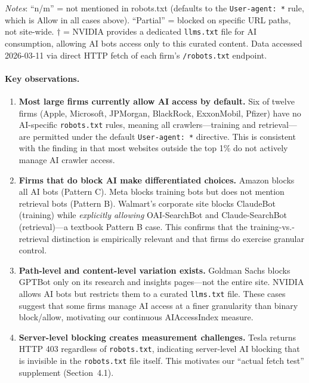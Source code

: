 \documentclass[12pt,a4paper]{article}
\begin{document}
\begin{table}[htbp]
\begin{tabularx}{\textwidth}{p{2.2cm}p{1.4cm}p{1.4cm}p{1.4cm}p{1.4cm}X}
\bottomrule
\end{tabularx}
\begin{tablenotes}
\small
\item \textit{Notes}: ``n/m'' = not mentioned in robots.txt (defaults to the \texttt{User-agent: *} rule, which is Allow in all cases above). ``Partial'' = blocked on specific URL paths, not site-wide. $\dagger$ = NVIDIA provides a dedicated \texttt{llms.txt} file for AI consumption, allowing AI bots access only to this curated content. Data accessed 2026-03-11 via direct HTTP fetch of each firm's \texttt{/robots.txt} endpoint.
\end{tablenotes}
\end{table}

\paragraph{Key observations.}
\begin{enumerate}
    \item \textbf{Most large firms currently allow AI access by default.} Six of twelve firms (Apple, Microsoft, JPMorgan, BlackRock, ExxonMobil, Pfizer) have no AI-specific \texttt{robots.txt} rules, meaning all crawlers---training and retrieval---are permitted under the default \texttt{User-agent: *} directive. This is consistent with the finding in \citet{Reitinger2025} that most websites outside the top 1\% do not actively manage AI crawler access.

    \item \textbf{Firms that do block AI make differentiated choices.} Amazon blocks all AI bots (Pattern C). Meta blocks training bots but does not mention retrieval bots (Pattern B). Walmart's corporate site blocks ClaudeBot (training) while \emph{explicitly allowing} OAI-SearchBot and Claude-SearchBot (retrieval)---a textbook Pattern B case. This confirms that the training-vs.-retrieval distinction is empirically relevant and that firms do exercise granular control.

    \item \textbf{Path-level and content-level variation exists.} Goldman Sachs blocks GPTBot only on its research and insights pages---not the entire site. NVIDIA allows AI bots but restricts them to a curated \texttt{llms.txt} file. These cases suggest that some firms manage AI access at a finer granularity than binary block/allow, motivating our continuous AIAccessIndex measure.

    \item \textbf{Server-level blocking creates measurement challenges.} Tesla returns HTTP 403 regardless of \texttt{robots.txt}, indicating server-level AI blocking that is invisible in the \texttt{robots.txt} file itself. This motivates our ``actual fetch test'' supplement (Section~4.1).
\end{enumerate}
\end{document}
